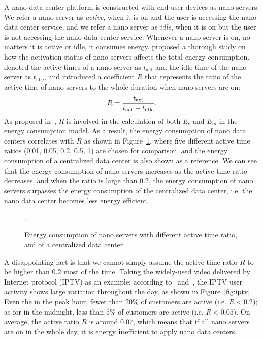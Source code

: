 A nano data center platform is constructed with end-user devices as nano servers.
We refer a nano server as \textit{active}, when it is on and the user is accessing the nano data center service,
and we refer a nano server as \textit{idle}, when it is on but the user is not accessing the nano data center service.
Whenever a nano server is on,
no matters it is active or idle,
it consumes energy.
\cite{DBLP:conf/conext/ValanciusLMDR09} proposed a thorough study on how the activation status of nano servers affects the total energy consumption.
\cite{DBLP:conf/conext/ValanciusLMDR09} denoted the active times of a nano server as $t_\text{act}$ and the idle time of the nano server as $t_\text{idle}$,
and introduced a coefficient $R$ that represents the ratio of the active time of nano servers to the whole duration when nano servers are on:
\begin{equation}
R=\frac{t_\text{act}}{t_\text{act}+t_\text{idle}}.\\
\end{equation}
As proposed in~\cite{DBLP:conf/conext/ValanciusLMDR09}, 
$R$ is involved in the calculation of both $E_c$ and $E_m$ in the energy consumption model.
As a result,
the energy consumption of nano data centers correlates with $R$ as shown in Figure~\ref{fig:active},
where five different active time ratios (0.01, 0.05, 0.2, 0.5, 1) are chosen for comparison,	
and the energy consumption of a centralized data center is also shown as a reference.
We can see that the energy consumption of nano servers increases as the active time ratio decreases,
and when the ratio is large than 0.2, the energy consumption of nano servers surpasses the energy consumption of the centralized data center,
i.e. the nano data center becomes less energy efficient.

\begin{figure}[h]
	\fontsize{12}{12} \selectfont
	\centerline{\resizebox{5cm}{!}{}}
	\caption{Energy consumption of nano servers with different active time ratio, and of a centralized data center~\cite{DBLP:conf/conext/ValanciusLMDR09}}.
	\label{fig:active}
	\normalsize
\end{figure}

A disappointing fact is that we cannot simply assume the active time ratio $R$ to be higher than $0.2$ most of the time.
Taking the widely-used video delivered by Internet protocol (IPTV)  as an example:
according to~\cite{DBLP:conf/conext/ValanciusLMDR09} and~\cite{watchingTV},
the IPTV user activity shows large variation throughout the day,
as shown in Figure~\ref{fig:iptv}.
Even the in the peak hour,
fewer than $20\%$ of customers are active (i.e. $R<0.2$);
as for in the midnight,
less than $5\%$ of customers are active (i.e. $R<0.05$).
On average,
the active ratio $R$ is around $0.07$,
which means that if all nano servers are on in the whole day,
it is energy \textbf{in}efficient to apply nano data centers.

